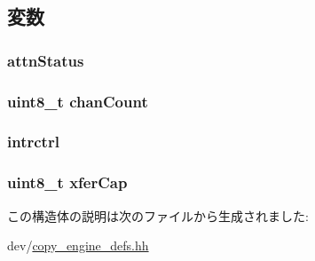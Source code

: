 \subsection{変数}
\hypertarget{structCopyEngineReg_1_1Regs_a96b8c5009091673411f229448c8d2de1}{
\subsubsection[{attnStatus}]{ {\bf attnStatus}}}
\label{structCopyEngineReg_1_1Regs_a96b8c5009091673411f229448c8d2de1}
\hypertarget{structCopyEngineReg_1_1Regs_a72591202604201c764b2d2330de87eb9}{
\subsubsection[{chanCount}]{\setlength{\rightskip}{0pt plus 5cm}uint8\_\-t {\bf chanCount}}}
\label{structCopyEngineReg_1_1Regs_a72591202604201c764b2d2330de87eb9}
\hypertarget{structCopyEngineReg_1_1Regs_adb90603779b60249df8136e1537ebeb7}{
\subsubsection[{intrctrl}]{ {\bf intrctrl}}}
\label{structCopyEngineReg_1_1Regs_adb90603779b60249df8136e1537ebeb7}
\hypertarget{structCopyEngineReg_1_1Regs_ad07b5a14bd75791ecb3aec74efe132ac}{
\subsubsection[{xferCap}]{\setlength{\rightskip}{0pt plus 5cm}uint8\_\-t {\bf xferCap}}}
\label{structCopyEngineReg_1_1Regs_ad07b5a14bd75791ecb3aec74efe132ac}


この構造体の説明は次のファイルから生成されました:\begin{DoxyCompactItemize}
\item 
dev/\hyperlink{copy__engine__defs_8hh}{copy\_\-engine\_\-defs.hh}\end{DoxyCompactItemize}
